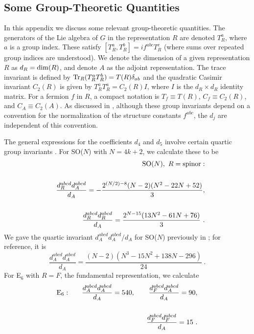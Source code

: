 \documentclass[prd,twocolumn,nofootinbib,amsfonts,amssymb]{revtex4}
\newcommand{\beq}{\begin{equation}}
\newcommand{\eeq}{\end{equation}}
\newcommand{\beqs}{\begin{eqnarray}}
\newcommand{\eeqs}{\end{eqnarray}}
\begin{document}
\begin{appendix}

\section{Some Group-Theoretic Quantities}
\label{group_invariants}

\bigskip

In this appendix we discuss some relevant group-theoretic quantities.  The
generators of the Lie algebra of $G$ in the representation $R$ are denoted
$T^a_R$, where $a$ is a group index. These satisfy $[T^a_R,T^b_R]=if^{abc}
T^c_R$ (where sums over repeated group indices are understood). We denote the
dimension of a given representation $R$ as $d_R = {\rm dim}(R)$, and denote $A$
as the adjoint representation. The trace invariant is defined by ${\rm
  Tr}_R(T^a_R T^b_R) = T(R)\delta_{ab}$ and the quadratic Casimir invariant
$C_2(R)$ is given by $T^a_RT^a_R = C_2(R) I$, where $I$ is the $d_R \times d_R$
identity matrix.  For a fermion $f$ in $R$, a compact notation is $T_f \equiv
T(R)$, $C_f \equiv C_2(R)$, and $C_A \equiv C_2(A)$. As discussed in
\cite{dexo}, although these group invariants depend on a convention for the
normalization of the structure constants $f^{abc}$, the $d_j$ are independent
of this convention.

The general expressions for the coefficients $d_4$ and $d_5$ 
\cite{dex,dexl} involve certain quartic group invariants \cite{quartic}. 
For SO($N$) with $N=4k+2$, we calculate these to be 
%
\beqs
&& {\rm SO}(N), \ R = {\rm spinor}: \cr\cr
   && \frac{d_R^{abcd}d_A^{abcd}}{d_A} = 
-\frac{2^{(N/2)-8}(N-2)(N^2-22N+52)}{3}, \cr\cr
   && \frac{d_R^{abcd}d_R^{abcd}}{d_A} = 
\frac{2^{N-15}(13N^2-61N+76)}{3} \ . 
\label{quartics_so}
\eeqs
%
We gave the quartic invariant $d_A^{abcd}d_A^{abcd}/d_A$ for SO($N$) 
previously in \cite{dexo}; for reference, it is 
%
\beq
\frac{d_A^{abcd}d_A^{abcd}}{d_A} = \frac{(N-2)(N^3-15N^2+138N-296)}{24} \ . 
\label{dada_over_na_so}
\eeq
%
For E$_6$ with $R=F$, the fundamental representation, we calculate 
%
\beqs
{\rm E}_6: && \quad \frac{d_A^{abcd}d_A^{abcd}}{d_A} = 540, \qquad 
\frac{d_F^{abcd}d_A^{abcd}}{d_A} = 90, \cr\cr
&& \frac{d_F^{abcd}d_F^{abcd}}{d_A} = 15 \ . 
\label{quartics_e6}
\eeqs
%

\end{appendix} 

\end{document}
